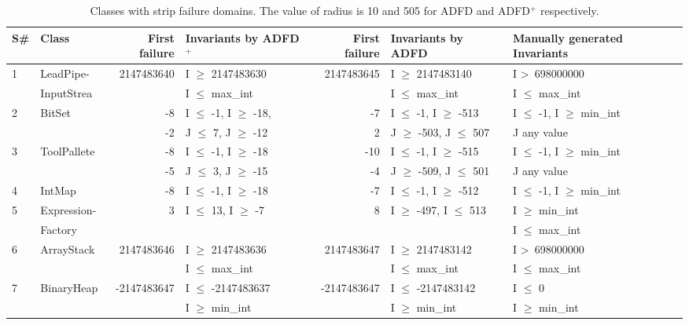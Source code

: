 \clearpage
\newpage
{\tiny
\begin{longtable}{|l|l|r|l|r|l|l|}
\caption{Classes with strip failure domains. The value of radius is 10 and 505 for ADFD and ADFD$^+$ respectively.}\\
\hline
S\#  & Class						& First failure	& Invariants by ADFD$^+$       & First failure 	& Invariants by ADFD     			& Manually generated Invariants				\\
  \hline
  \endhead
1	& LeadPipe- 			 		&2147483640	& I $\ge$ 2147483630		&~2147483645	& I $\ge$ 2147483140			& I \textgreater~698000000		\\ 
	& InputStrea                            &				& I $\le$ max\_int			&				& I $\le$ max\_int				& I $\le$ max\_int				\\ \hline
2	& BitSet				  		& -8 			& I $\le$ -1, I $\ge$ -18,		&-7 			& I $\le$ -1, I $\ge$ -513			& I $\le$ -1, I $\ge$ min\_int		\\ 
	&                                             &-2 			& J $\le$ 7, J $\ge$ -12  		&~2 			& J $\ge$ -503, J $\le$ 507		& J any value						\\\hline
3	& ToolPallete			  		&-8 			& I $\le$ -1, I $\ge$ -18		&-10 			& I $\le$ -1, I $\ge$ -515			& I $\le$ -1, I $\ge$ min\_int		\\ 
	&                                             &-5 			& J $\le$ 3, J $\ge$ -15		&-4 			& J $\ge$ -509, J $\le$ 501		& J any value			   			\\\hline
4	& IntMap			  		&-8 			& I $\le$ -1, I $\ge$ -18		&-7 			& I $\le$ -1, I $\ge$ -512			& I $\le$ -1, I $\ge$ min\_int		\\\hline
5	& Expression-		  		&3 				& I $\le$ 13, I $\ge$ -7		&~8 			& I $\ge$ -497, I $\le$ 513		& I $\ge$ min\_int 				\\
	& Factory                                 &  				&	 						&				&								& I $\le$ max\_int				\\\hline
6	& ArrayStack					&2147483646	& I $\ge$ 2147483636		&~2147483647	& I $\ge$ 2147483142			& I \textgreater~698000000 		\\ 
	&                                             &				& I $\le$ max\_int		 	&				& I $\le$ max\_int				& I $\le$ max\_int 				\\\hline
7	& BinaryHeap				&-2147483647	& I $\le$ -2147483637		&-2147483647	& I $\le$ -2147483142			& I $\le$ 0						\\	
	&                                             &				& I $\ge$ min\_int			&				& I $\ge$ min\_int				& I $\ge$ min\_int				\\\hline

\end{longtable}}

